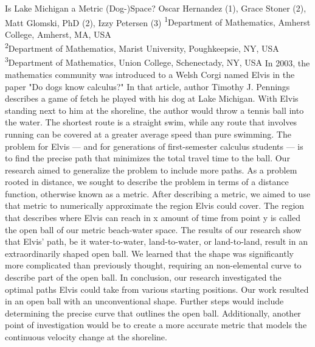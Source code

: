 \makeabstract
{
Is Lake Michigan a Metric (Dog-)Space?
}
{
Oscar Hernandez (1), Grace Stoner (2), Matt Glomski, PhD (2), Izzy Petersen (3)
}
{
\textsuperscript{1}Department of Mathematics, Amherst College, Amherst, MA, USA\\
\textsuperscript{2}Department of Mathematics, Marist University, Poughkeepsie, NY, USA\\
\textsuperscript{3}Department of Mathematics, Union College, Schenectady, NY, USA
}
{
In 2003, the mathematics community was introduced to a Welsh Corgi named Elvis in the paper "Do dogs know calculus?" In that article, author Timothy J. Pennings describes a game of fetch he played with his dog at Lake Michigan. With Elvis standing next to him at the shoreline, the author would throw a tennis ball into the water. The shortest route is a straight swim, while any route that involves running can be covered at a greater average speed than pure swimming. The problem for Elvis — and for generations of first-semester calculus students — is to find the precise path that minimizes the total travel time to the ball. Our research aimed to generalize the problem to include more paths.
}
{
As a problem rooted in distance, we sought to describe the problem in terms of a distance function, otherwise known as a metric. After describing a metric, we aimed to use that metric to numerically approximate the region Elvis could cover. The region that describes where Elvis can reach in x amount of time from point y is called the open ball of our metric beach-water space. 
}
{
The results of our research show that Elvis’ path, be it water-to-water, land-to-water, or land-to-land, result in an extraordinarily shaped open ball. We learned that the shape was significantly more complicated than previously thought, requiring an non-elemental curve to describe part of the open ball.
}
{
In conclusion, our research investigated the optimal paths Elvis could take from various starting positions. Our work resulted in an open ball with an unconventional shape. Further steps would include determining the precise curve that outlines the open ball. Additionally, another point of investigation would be to create a more accurate metric that models the continuous velocity change at the shoreline.
}

\newpage
